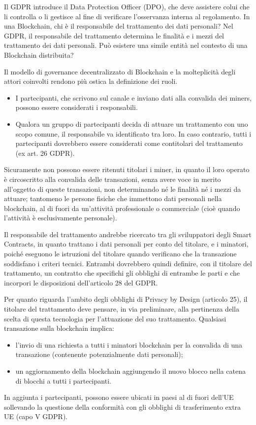 \vspace{5mm}

Il GDPR introduce il Data Protection Officer (DPO), che deve assistere
colui che li controlla o li gestisce al fine di verificare l’osservanza interna
al regolamento. In una Blockchain, chi è il responsabile del trattamento dei dati
personali? Nel GDPR, il responsabile del trattamento determina le
finalità e i mezzi del trattamento dei dati personali. Può esistere una
simile entità nel contesto di una Blockchain distribuita?

Il modello di governance decentralizzato di Blockchain e la molteplicità
degli attori coinvolti rendono più ostica la definizione dei ruoli.
\begin{itemize}
    \item I partecipanti, che scrivono sul canale e inviano dati alla convalida
dei miners, possono essere considerati i responsabili.
    \item Qualora un gruppo di partecipanti decida di attuare un
trattamento con uno scopo comune, il responsabile va identificato
tra loro. In caso contrario, tutti i partecipanti dovrebbero essere
considerati come contitolari del trattamento (ex art. 26 GDPR).
\end{itemize}
Sicuramente non possono essere ritenuti titolari i miner, in quanto il loro operato è circoscritto alla convalida delle
transazioni, senza avere voce in merito all’oggetto di queste
transazioni, non determinando né le finalità né i mezzi da attuare; tantomeno le persone fisiche che immettono dati personali nella blockchain, al
di fuori da un’attività professionale o commerciale (cioè quando
l’attività è esclusivamente personale).

Il responsabile del trattamento andrebbe ricercato tra gli sviluppatori degli Smart Contracts, in quanto trattano i dati
personali per conto del titolare, e i minatori, poiché eseguono le istruzioni del titolare quando
verificano che la transazione soddisfano i criteri tecnici.
Entrambi dovrebbero quindi definire, con il titolare del trattamento, un
contratto che specifichi gli obblighi di entrambe le parti e che incorpori
le disposizioni dell’articolo 28 del GDPR.

Per quanto riguarda l’ambito degli obblighi di Privacy by Design
(articolo 25), il titolare del trattamento deve pensare, in via
preliminare, alla pertinenza della scelta di questa tecnologia per
l’attuazione del suo trattamento.
Qualsiasi transazione sulla blockchain implica:
\begin{itemize}
    \item l’invio di una richiesta a tutti i minatori blockchain per la convalida
di una transazione (contenente potenzialmente dati personali);
    \item un aggiornamento della blockchain aggiungendo il nuovo blocco
nella catena di blocchi a tutti i partecipanti.
\end{itemize}
In aggiunta i partecipanti, possono essere ubicati in paesi al di fuori
dell’UE sollevando la questione della conformità con gli obblighi di
trasferimento extra UE (capo V GDPR).

